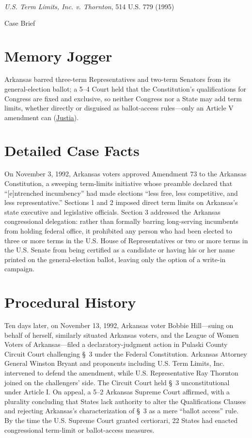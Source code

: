 \documentclass[12pt]{article}
\begin{document}
\begin{center}
{\LARGE \textit{U.S. Term Limits, Inc. v. Thornton}, 514 U.S. 779 (1995)\par}
\vspace{0.8em}
{\large Case Brief\par}
\end{center}
\vspace{1em}

\section{Memory Jogger}
Arkansas barred three-term Representatives and two-term Senators from its general-election ballot; a 5--4 Court held that the Constitution's qualifications for Congress are fixed and exclusive, so neither Congress nor a State may add term limits, whether directly or disguised as ballot-access rules---only an Article V amendment can (\href{https://supreme.justia.com/cases/federal/us/514/779/}{Justia}).

\section{Detailed Case Facts}
On November 3, 1992, Arkansas voters approved Amendment 73 to the Arkansas Constitution, a sweeping term-limits initiative whose preamble declared that ``[e]ntrenched incumbency'' had made elections ``less free, less competitive, and less representative.'' Sections 1 and 2 imposed direct term limits on Arkansas's state executive and legislative officials. Section 3 addressed the Arkansas congressional delegation: rather than formally barring long-serving incumbents from holding federal office, it prohibited any person who had been elected to three or more terms in the U.S. House of Representatives or two or more terms in the U.S. Senate from being certified as a candidate or having his or her name printed on the general-election ballot, leaving only the option of a write-in campaign.

\section{Procedural History}
Ten days later, on November 13, 1992, Arkansas voter Bobbie Hill---suing on behalf of herself, similarly situated Arkansas voters, and the League of Women Voters of Arkansas---filed a declaratory-judgment action in Pulaski County Circuit Court challenging \S~3 under the Federal Constitution. Arkansas Attorney General Winston Bryant and proponents including U.S. Term Limits, Inc. intervened to defend the amendment, while U.S. Representative Ray Thornton joined on the challengers' side. The Circuit Court held \S~3 unconstitutional under Article I. On appeal, a 5--2 Arkansas Supreme Court affirmed, with a plurality concluding that States lack authority to alter the Qualifications Clauses and rejecting Arkansas's characterization of \S~3 as a mere ``ballot access'' rule. By the time the U.S. Supreme Court granted certiorari, 22 States had enacted congressional term-limit or ballot-access measures.
\end{document}
